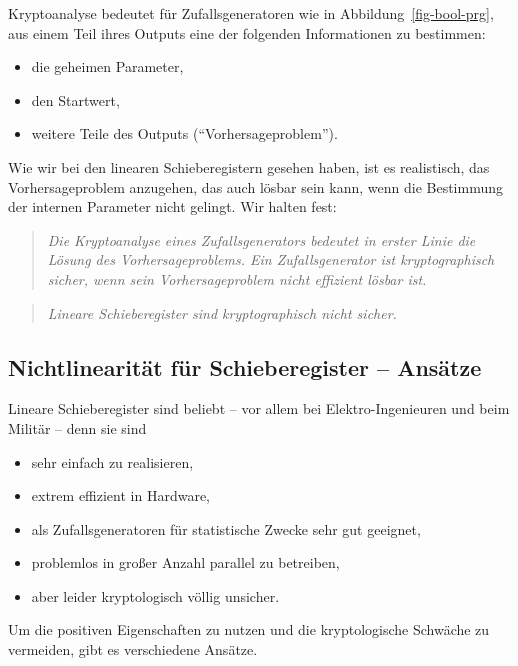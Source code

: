 \begin{refsegment}
Kryptoanalyse bedeutet für Zufallsgeneratoren wie in Abbildung~\ref{fig-bool-prg},
aus einem Teil ihres Outputs eine der folgenden Informationen zu bestimmen:
\begin{itemize}
\item die geheimen Parameter,
\item den Startwert,
\item weitere Teile des Outputs ("`Vorhersageproblem"').
\end{itemize}
Wie wir bei den linearen
Schieberegistern
gesehen haben, ist es
realistisch, das Vorhersageproblem anzugehen, das auch lösbar sein
kann, wenn die Bestimmung der internen Parameter nicht gelingt.
Wir halten fest:
\begin{quote}
   {\em Die Kryptoanalyse eines Zufallsgenerators bedeutet in erster Linie
   die Lösung des Vorhersageproblems. Ein Zufallsgenerator
   ist kryptographisch
   sicher, wenn sein Vorhersageproblem nicht effizient lösbar ist.}
\end{quote}

\begin{quote}
   {\em Lineare Schieberegister
   sind kryptographisch nicht sicher.}
\end{quote}

\subsection{Nichtlinearität für Schieberegister
   -- Ansätze}\label{ss-bool-nlsr}

Lineare Schieberegister sind beliebt -- vor allem bei Elektro-Ingenieuren
und beim Militär -- denn sie sind
\begin{itemize}
	\item sehr einfach zu realisieren,
	\item extrem effizient in Hardware,
	\item als Zufallsgeneratoren für statistische Zwecke sehr gut geeignet,
	\item problemlos in großer Anzahl parallel zu betreiben,
	\item aber leider kryptologisch völlig unsicher.
\end{itemize}
Um die positiven Eigenschaften zu nutzen und die kryptologische Schwäche
zu vermeiden, gibt es verschiedene Ansätze.


\end{refsegment}
